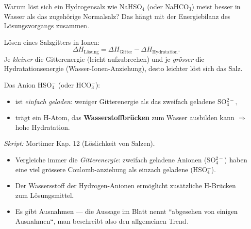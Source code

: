 

Warum löst sich ein Hydrogensalz wie NaHSO$_4$ (oder NaHCO$_3$) meist besser
in Wasser als das zugehörige Normalsalz? Das hängt mit der Energiebilanz des
Lösungsvorgangs zusammen.

\begin{werkzeugkasten}
Lösen eines Salzgitters in Ionen:
\[
  \Delta H_{\text{Lösung}} = \Delta H_{\text{Gitter}}
  - \Delta H_{\text{Hydratation}} .
\]
Je \emph{kleiner} die Gitterenergie (leicht aufzubrechen) und je
\emph{grösser} die Hydratationsenergie (Wasser-Ionen-Anziehung), desto
leichter löst sich das Salz.

Das Anion HSO$_4^-$ (oder HCO$_3^-$):
\begin{itemize}
  \item ist \emph{einfach geladen}: weniger Gitterenergie als das
        zweifach geladene SO$_4^{2-}$,
  \item trägt ein H-Atom, das \textbf{Wasserstoffbrücken} zum Wasser
        ausbilden kann $\Rightarrow$ hohe Hydratation.
\end{itemize}
\textit{Skript:} Mortimer Kap. 12 (Löslichkeit von Salzen).
\end{werkzeugkasten}

\begin{achtung}
\begin{itemize}
  \item Vergleiche immer die \emph{Gitterenergie}: zweifach geladene
        Anionen (SO$_4^{2-}$) haben eine viel grössere Coulomb-anziehung als
        einzach geladene (HSO$_4^-$).
  \item Der Wassersstoff der Hydrogen-Anionen ermöglicht zusätzliche
        H-Brücken zum Lösungsmittel.
  \item Es gibt Ausnahmen --- die Aussage im Blatt nennt ``abgesehen von
        einigen Ausnahmen``, man beschreibt also den allgemeinen Trend.
\end{itemize}
\end{achtung}
